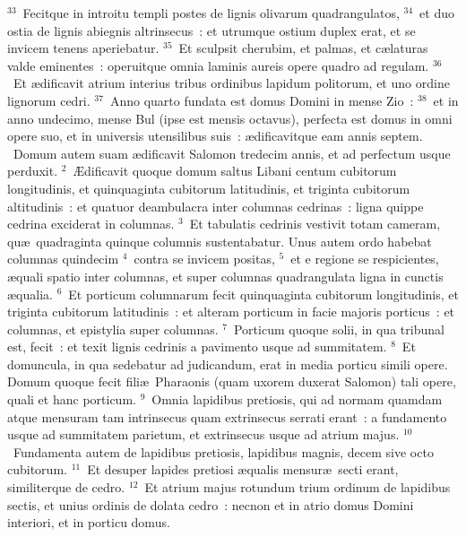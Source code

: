 ${}^{33}$~Fecitque in introitu templi postes de lignis olivarum quadrangulatos,
${}^{34}$~et duo ostia de lignis abiegnis altrinsecus~: et utrumque ostium duplex erat, et se invicem tenens aperiebatur.
${}^{35}$~Et sculpsit cherubim, et palmas, et c\ae laturas valde eminentes~: operuitque omnia laminis aureis opere quadro ad regulam.
${}^{36}$~Et \ae dificavit atrium interius tribus ordinibus lapidum politorum, et uno ordine lignorum cedri.
${}^{37}$~Anno quarto fundata est domus Domini in mense Zio~:
${}^{38}$~et in anno undecimo, mense Bul (ipse est mensis octavus), perfecta est domus in omni opere suo, et in universis utensilibus suis~: \ae dificavitque eam annis septem.
~Domum autem suam \ae dificavit Salomon tredecim annis, et ad perfectum usque perduxit.
${}^{2}$~\AE dificavit quoque domum saltus Libani centum cubitorum longitudinis, et quinquaginta cubitorum latitudinis, et triginta cubitorum altitudinis~: et quatuor deambulacra inter columnas cedrinas~: ligna quippe cedrina exciderat in columnas.
${}^{3}$~Et tabulatis cedrinis vestivit totam cameram, qu\ae\ quadraginta quinque columnis sustentabatur. Unus autem ordo habebat columnas quindecim
${}^{4}$~contra se invicem positas,
${}^{5}$~et e regione se respicientes, \ae quali spatio inter columnas, et super columnas quadrangulata ligna in cunctis \ae qualia.
${}^{6}$~Et porticum columnarum fecit quinquaginta cubitorum longitudinis, et triginta cubitorum latitudinis~: et alteram porticum in facie majoris porticus~: et columnas, et epistylia super columnas.
${}^{7}$~Porticum quoque solii, in qua tribunal est, fecit~: et texit lignis cedrinis a pavimento usque ad summitatem.
${}^{8}$~Et domuncula, in qua sedebatur ad judicandum, erat in media porticu simili opere. Domum quoque fecit fili\ae\ Pharaonis (quam uxorem duxerat Salomon) tali opere, quali et hanc porticum.
${}^{9}$~Omnia lapidibus pretiosis, qui ad normam quamdam atque mensuram tam intrinsecus quam extrinsecus serrati erant~: a fundamento usque ad summitatem parietum, et extrinsecus usque ad atrium majus.
${}^{10}$~Fundamenta autem de lapidibus pretiosis, lapidibus magnis, decem sive octo cubitorum.
${}^{11}$~Et desuper lapides pretiosi \ae qualis mensur\ae\ secti erant, similiterque de cedro.
${}^{12}$~Et atrium majus rotundum trium ordinum de lapidibus sectis, et unius ordinis de dolata cedro~: necnon et in atrio domus Domini interiori, et in porticu domus.


